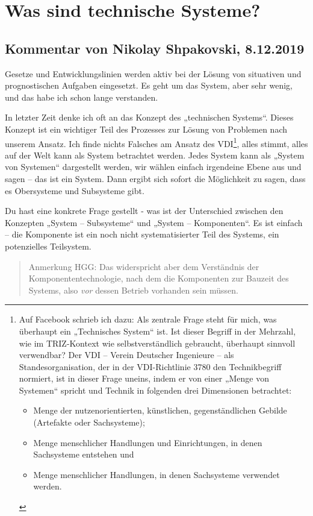 \documentclass[11pt,a4paper]{article}
\begin{document}
\section{Was sind technische Systeme?}


\subsection{Kommentar von Nikolay Shpakovski, 8.12.2019}

Gesetze und Entwicklungslinien werden aktiv bei der Lösung von situativen und
prognostischen Aufgaben eingesetzt. Es geht um das System, aber sehr wenig,
und das habe ich schon lange verstanden.

In letzter Zeit denke ich oft an das Konzept des „technischen Systems“. Dieses
Konzept ist ein wichtiger Teil des Prozesses zur Lösung von Problemen nach
unserem Ansatz. Ich finde nichts Falsches am Ansatz des VDI\footnote{Auf
  Facebook schrieb ich dazu: Als zentrale Frage steht für mich, was überhaupt
  ein „Technisches System“ ist. Ist dieser Begriff in der Mehrzahl, wie im
  TRIZ-Kontext wie selbstverständlich gebraucht, überhaupt sinnvoll
  verwendbar? Der VDI -- Verein Deutscher Ingenieure -- als
  Standesorganisation, der in der VDI-Richtlinie 3780 den Technikbegriff
  normiert, ist in dieser Frage uneins, indem er von einer „Menge von
  Systemen“ spricht und Technik in folgenden drei Dimensionen betrachtet: 
  \begin{itemize}
  \item Menge der nutzenorientierten, künstlichen, gegenständlichen Gebilde
    (Artefakte oder Sachsysteme);
  \item Menge menschlicher Handlungen und Einrichtungen, in denen Sachsysteme
    entstehen und
  \item Menge menschlicher Handlungen, in denen Sachsysteme verwendet werden.
  \end{itemize}}, alles stimmt, alles auf der Welt kann als System betrachtet
werden.  Jedes System kann als „System von Systemen“ dargestellt werden, wir
wählen einfach irgendeine Ebene aus und sagen -- das ist ein System.  Dann
ergibt sich sofort die Möglichkeit zu sagen, dass es Obersysteme und
Subsysteme gibt.

Du hast eine konkrete Frage gestellt - was ist der Unterschied zwischen den
Konzepten „System -- Subsysteme“ und „System -- Komponenten“. Es ist einfach
-- die Komponente ist ein noch nicht systematisierter Teil des Systems, ein
potenzielles Teilsystem.
\begin{quote}
  Anmerkung HGG: Das widerspricht aber dem Verständnis der
  Komponententechnologie, nach dem die Komponenten zur Bauzeit des Systems,
  also \emph{vor} dessen Betrieb vorhanden sein müssen.
\end{quote}
\end{document}
